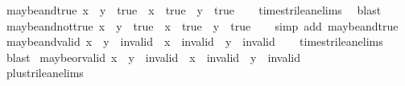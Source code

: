\begin{isabellebody}
{\isafoldproof}%
%
\isadelimproof
\isanewline
%
\endisadelimproof
\isanewline
{}\isamarkupfalse%
\ maybe{\isacharunderscore}and{\isacharunderscore}true{\isacharcolon}\ {\isachardoublequoteopen}{\isacharparenleft}x\ {\isasymand}\isactrlsub {\isacharquery}\ y\ {\isacharequal}\ true{\isacharparenright}\ {\isacharequal}\ {\isacharparenleft}x\ {\isacharequal}\ true\ {\isasymand}\ y\ {\isacharequal}\ true{\isacharparenright}{\isachardoublequoteclose}\isanewline
%
\isadelimproof
\ \ %
\endisadelimproof
%
\isatagproof
{}\isamarkupfalse%
\ times{\isacharunderscore}trilean{\isachardot}elims\ \isamarkupfalse%
\ blast%
\endisatagproof
{\isafoldproof}%
%
\isadelimproof
\isanewline
%
\endisadelimproof
\isanewline
{}\isamarkupfalse%
\ maybe{\isacharunderscore}and{\isacharunderscore}not{\isacharunderscore}true{\isacharcolon}\ {\isachardoublequoteopen}{\isacharparenleft}x\ {\isasymand}\isactrlsub {\isacharquery}\ y\ {\isasymnoteq}\ true{\isacharparenright}\ {\isacharequal}\ {\isacharparenleft}x\ {\isasymnoteq}\ true\ {\isasymor}\ y\ {\isasymnoteq}\ true{\isacharparenright}{\isachardoublequoteclose}\isanewline
%
\isadelimproof
\ \ %
\endisadelimproof
%
\isatagproof
{}\isamarkupfalse%
\ {\isacharparenleft}simp\ add{\isacharcolon}\ maybe{\isacharunderscore}and{\isacharunderscore}true{\isacharparenright}%
\endisatagproof
{\isafoldproof}%
%
\isadelimproof
\isanewline
%
\endisadelimproof
\isanewline
{}\isamarkupfalse%
\ maybe{\isacharunderscore}and{\isacharunderscore}valid{\isacharcolon}\ {\isachardoublequoteopen}x\ {\isasymand}\isactrlsub {\isacharquery}\ y\ {\isasymnoteq}\ invalid\ {\isasymLongrightarrow}\ x\ {\isasymnoteq}\ invalid\ {\isasymand}\ y\ {\isasymnoteq}\ invalid{\isachardoublequoteclose}\isanewline
%
\isadelimproof
\ \ %
\endisadelimproof
%
\isatagproof
{}\isamarkupfalse%
\ times{\isacharunderscore}trilean{\isachardot}elims\ \isamarkupfalse%
\ blast%
\endisatagproof
{\isafoldproof}%
%
\isadelimproof
\isanewline
%
\endisadelimproof
\isanewline
{}\isamarkupfalse%
\ maybe{\isacharunderscore}or{\isacharunderscore}valid{\isacharcolon}\ {\isachardoublequoteopen}x\ {\isasymor}\isactrlsub {\isacharquery}\ y\ {\isasymnoteq}\ invalid\ {\isasymLongrightarrow}\ x\ {\isasymnoteq}\ invalid\ {\isasymand}\ y\ {\isasymnoteq}\ invalid{\isachardoublequoteclose}\isanewline
%
\isadelimproof
\ \ %
\endisadelimproof
%
\isatagproof
{}\isamarkupfalse%
\ plus{\isacharunderscore}trilean{\isachardot}elims\ \isamarkupfalse%

\end{isabellebody}
